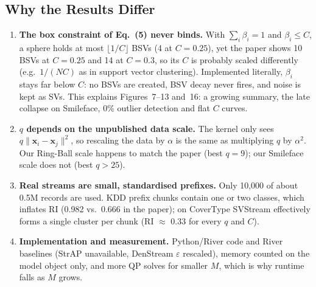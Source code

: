 \subsection{Why the Results Differ}
\label{subsec:svstream_discrepancies}

\begin{enumerate}[label=\textbf{\arabic*.},leftmargin=1.6em,itemsep=2pt]
  \item \textbf{The box constraint of Eq.~(5) never binds.} With $\sum_i \beta_i = 1$ and $\beta_i \le C$, a sphere holds at most $\lfloor 1/C \rfloor$ BSVs (4 at $C=0.25$), yet the paper shows 10 BSVs at $C=0.25$ and 14 at $C=0.3$, so its $C$ is probably scaled differently (e.g.\ $1/(NC)$ as in support vector clustering). Implemented literally, $\beta_i$ stays far below $C$: no BSVs are created, BSV decay never fires, and noise is kept as SVs. This explains Figures~7--13 and~16: a growing summary, the late collapse on Smileface, 0\% outlier detection and flat $C$ curves.
  \item \textbf{$q$ depends on the unpublished data scale.} The kernel only sees $q\|\mathbf{x}_i-\mathbf{x}_j\|^2$, so rescaling the data by $\alpha$ is the same as multiplying $q$ by $\alpha^2$. Our Ring-Ball scale happens to match the paper (best $q=9$); our Smileface scale does not (best $q > 25$).
  \item \textbf{Real streams are small, standardised prefixes.} Only 10,000 of about 0.5M records are used. KDD prefix chunks contain one or two classes, which inflates RI (0.982 vs.\ 0.666 in the paper); on CoverType SVStream effectively forms a single cluster per chunk (RI $\approx$ 0.33 for every $q$ and $C$).
  \item \textbf{Implementation and measurement.} Python/River code and River baselines (StrAP unavailable, DenStream $\varepsilon$ rescaled), memory counted on the model object only, and more QP solves for smaller $M$, which is why runtime falls as $M$ grows.
\end{enumerate}

